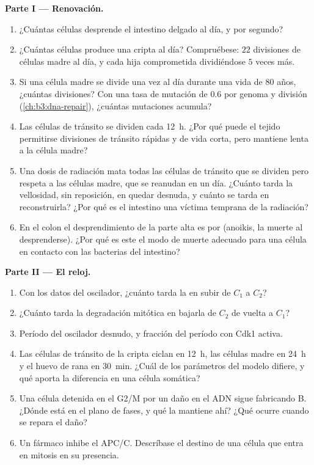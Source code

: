 \begin{problem}
\medskip
\noindent\textbf{Parte I --- Renovación.}
\begin{enumerate}
  \item ¿Cuántas células desprende el intestino delgado al día, y por
        segundo?
  \item ¿Cuántas células produce una cripta al día? Compruébese: $22$
        divisiones de células madre al día, y cada hija comprometida
        dividiéndose $5$ veces más.
  \item Si una célula madre se divide una vez al día durante una vida de
        $80$ años, ¿cuántas divisiones? Con una tasa de mutación de $0.6$
        por genoma y división (\cref{ch:b3:dna-repair}), ¿cuántas
        mutaciones acumula?
  \item Las células de tránsito se dividen cada \qty{12}{h}. ¿Por qué
        puede el tejido permitirse divisiones de tránsito rápidas y de
        vida corta, pero mantiene lenta a la célula madre?
  \item Una dosis de radiación mata todas las células de tránsito que se
        dividen pero respeta a las células madre, que se reanudan en un
        día. ¿Cuánto tarda la vellosidad, sin reposición, en quedar
        desnuda, y cuánto se tarda en reconstruirla? ¿Por qué es el
        intestino una víctima temprana de la radiación?
  \item En el colon el desprendimiento de la parte alta es por 
        (anoikis, la muerte al desprenderse). ¿Por qué es este el modo de
        muerte adecuado para una célula en contacto con las bacterias del
        intestino?
\end{enumerate}

\medskip
\noindent\textbf{Parte II --- El reloj.}
\begin{enumerate}[resume]
  \item Con los datos del oscilador, ¿cuánto tarda la  en subir de
        $C_{1}$ a $C_{2}$?
  \item ¿Cuánto tarda la degradación mitótica en bajarla de $C_{2}$ de
        vuelta a $C_{1}$?
  \item Período del oscilador desnudo, y fracción del período con Cdk1
        activa.
  \item Las células de tránsito de la cripta ciclan en \qty{12}{h}, las
        células madre en \qty{24}{h} y el huevo de rana en \qty{30}{min}.
        ¿Cuál de los parámetros del modelo difiere, y qué aporta la
        diferencia en una célula somática?
  \item Una célula detenida en el  G2/M por un daño en el
        ADN sigue fabricando  B. ¿Dónde está en el plano de fases,
        y qué la mantiene ahí? ¿Qué ocurre cuando se repara el daño?
  \item Un fármaco inhibe el APC/C. Descríbase el destino de una célula
        que entra en mitosis en su presencia.
\end{enumerate}


\end{problem}
